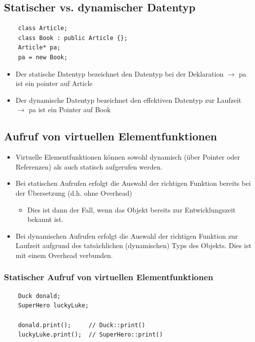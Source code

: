 \subsection{Statischer vs. dynamischer Datentyp}
\noindent
\begin{minipage}{\linewidth}
	\begin{lstlisting}
	class Article;
	class Book : public Article {};
	Article* pa;
	pa = new Book;
	\end{lstlisting}
\end{minipage}
\begin{itemize}
	\item Der statische Datentyp bezeichnet den Datentyp bei der Deklaration $\rightarrow$ pa ist ein pointer auf Article
	\item Der dynamische Datentyp bezeichnet den effektiven Datentyp zur Laufzeit $\rightarrow$ pa ist ein Pointer auf Book
\end{itemize}

\subsection{Aufruf von virtuellen Elementfunktionen}
\label{sec:aufrufVonVirtuellenElemenfunktionen}
\begin{itemize}
	\item Virtuelle Elementfunktionen können sowohl dynamisch (über Pointer oder Referenzen) als auch statisch aufgerufen werden.
	\item Bei statischen Aufrufen erfolgt die Auswahl der richtigen Funktion bereits bei der Übersetzung (d.h. ohne Overhead)
	\begin{itemize}
		\item Dies ist dann der Fall, wenn das Objekt bereits zur Entwicklungszeit bekannt ist.
	\end{itemize}
	\item Bei dynamischen Aufrufen erfolgt die Auswahl der richtigen Funktion zur Laufzeit aufgrund des tatsächlichen (dynamischen) Typs des Objekts. Dies ist mit einem Overhead verbunden.
\end{itemize}

\subsubsection{Statischer Aufruf von virtuellen Elementfunktionen}
\noindent
\begin{minipage}{\linewidth}
	\begin{lstlisting}
	Duck donald;
	SuperHero luckyLuke;
	
	donald.print();		// Duck::print()
	luckyLuke.print();	// SuperHero::print()
	\end{lstlisting}
\end{minipage}

